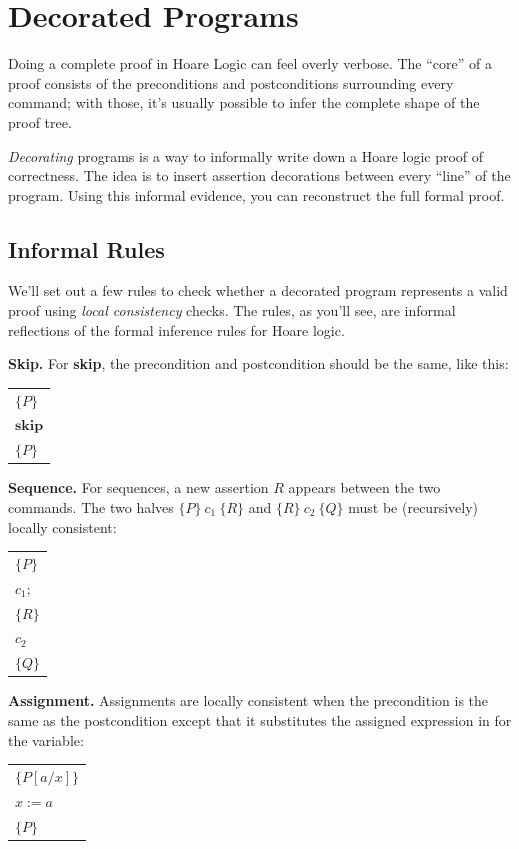 % 
\section{Decorated Programs}

Doing a complete proof in Hoare Logic can feel overly verbose. The ``core'' of a proof consists
of the preconditions and postconditions surrounding every command; with those, it's usually
possible to infer the complete shape of the proof tree.

\emph{Decorating} programs is a way to informally write down a Hoare logic proof of
correctness. The idea is to insert assertion decorations between every ``line'' of the program.
Using this informal evidence, you can reconstruct the full formal proof.

\subsection{Informal Rules}

We'll set out a few rules to check whether a decorated program represents a valid proof using
\emph{local consistency} checks. The rules, as you'll see, are informal reflections of the
formal inference rules for Hoare logic.

\medskip
\noindent\textbf{Skip.} For \textbf{skip}, the precondition and postcondition should be the
same, like this:
\begin{center}
\begin{tabular}{l}
$\{P\}$ \\
$\mathbf{skip}$ \\
$\{P\}$
\end{tabular}
\end{center}

\noindent\textbf{Sequence.} For sequences, a new assertion $R$ appears between the two
commands. The two halves $\{P\}\ c_1\ \{R\}$ and $\{R\}\ c_2\ \{Q\}$ must be (recursively)
locally consistent:
\begin{center}
\begin{tabular}{l}
$\{P\}$ \\
$c_1;$ \\
$\{R\}$ \\
$c_2$ \\
$\{Q\}$
\end{tabular}
\end{center}

\noindent\textbf{Assignment.} Assignments are locally consistent when the precondition is the
same as the postcondition except that it substitutes the assigned expression in for the
variable:
\begin{center}
\begin{tabular}{l}
$\{P[a/x]\}$ \\
$x := a$ \\
$\{P\}$
\end{tabular}
\end{center}

